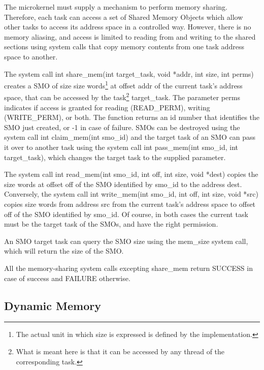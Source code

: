 \documentclass[11pt, letterpaper, twoside, english]{book}
\begin{document}
The microkernel must supply a mechanism to perform memory sharing. Therefore, each task can access a set of Shared Memory Objects which allow other tasks to access its address space in a controlled way. However, there is no memory aliasing, and access is limited to reading from and writing to the shared sections using system calls that copy memory contents from one task address space to another.

The system call \textsf{int share\_mem(int target\_task, void *addr, int size, int perms)} creates a SMO of size \textsf{size} words\footnote{The actual unit in which size is expressed is defined by the implementation.} at offset \textsf{addr} of the current task's address space, that can be accessed by the task\footnote{What is meant here is that it can be accessed by any thread of the corresponding task.} \textsf{target\_task}. The parameter \textsf{perms} indicates if access is granted for reading (\textsf{READ\_PERM}), writing (\textsf{WRITE\_PERM}), or both. The function returns an id number that identifies the SMO just created, or -1 in case of failure. SMOs can be destroyed using the system call \textsf{int claim\_mem(int smo\_id)} and the target task of an SMO can pass it over to another task using the system call \textsf{int pass\_mem(int smo\_id, int target\_task)}, which changes the target task to the supplied parameter.

The system call \textsf{int read\_mem(int smo\_id, int off, int size, void *dest)} copies the \textsf{size} words at offset \textsf{off} of the SMO identified by \textsf{smo\_id} to the address \textsf{dest}. Conversely, the system call \textsf{int write\_mem(int smo\_id, int off, int size, void *src)} copies \textsf{size} words from address \textsf{src} from the current task's address space to offset \textsf{off} of the SMO identified by \textsf{smo\_id}. Of course, in both cases the current task must be the target task of the SMOs, and have the right permission.

An SMO target task can query the SMO size using the \textsf{mem\_size} system call, which will return the size of the SMO.

All the memory-sharing system calls excepting \textsf{share\_mem} return SUCCESS in case of success and FAILURE otherwise.

\subsection{Dynamic Memory} \label{sec:dynamicmemory}
\end{document}
